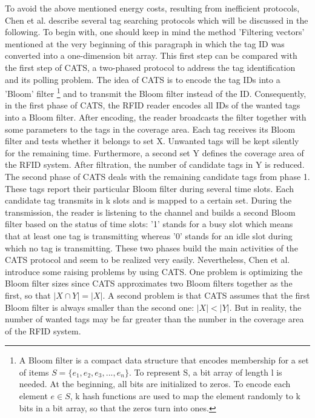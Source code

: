 To avoid the above mentioned energy costs, resulting from inefficient protocols, Chen et al. describe several tag searching protocols \cite[p.13 ff.]{chen} which will be discussed in the following. 
To begin with, one should keep in mind the method 'Filtering vectors' mentioned at the very beginning of this paragraph in which the tag ID was converted into a one-dimension bit array. This first step can be compared with the first step of \ac{CATS}, a two-phased protocol to address the tag identification and its polling problem. The idea of CATS is to encode the tag IDs into a 'Bloom' filter \footnote{A Bloom filter is a compact data structure that encodes membership for a set of items $S=\{ e_{1},e_{2},e_{3},...,e_{n}\}$. To represent S, a bit array of length l is needed. At the beginning, all bits are initialized to zeros. To encode each element $e \in S$, k hash functions are used to map the element randomly to k bits in a bit array, so that the zeros turn into ones.} \cite[p.15]{chen} and to transmit the Bloom filter instead of the ID. 
Consequently, in the first phase of CATS, the RFID reader encodes all IDs of the wanted tags into a Bloom filter. After encoding, the reader broadcasts the filter together with some parameters to the tags in the coverage area. Each tag receives its Bloom filter and tests whether it belongs to set X. Unwanted tags will be kept silently for the remaining time. Furthermore, a second set Y defines the coverage area of the RFID system. After filtration, the number of candidate tags in Y is reduced.
The second phase of CATS deals with the remaining candidate tags from phase 1. These tags report their particular Bloom filter during several time slots. Each candidate tag transmits in k slots and is mapped to a certain set. During the transmission, the reader is listening to the channel and builds a second Bloom filter based on the status of time slots: '1' stands for a busy slot which means that at least one tag is transmitting whereas '0' stands for an idle slot during which no tag is transmitting. 
These two phases build the main activities of the CATS protocol and seem to be realized very easily. Nevertheless, Chen et al. introduce some raising problems by using CATS. One problem is optimizing the Bloom filter sizes since CATS approximates two Bloom filters together as the first, so that $|X \cap Y|=|X|$. A second problem is that CATS assumes that the first Bloom filter is always smaller than the second one: $|X|<|Y|$. But in reality, the number of wanted tags may be far greater than the number in the coverage area of the RFID system. 

